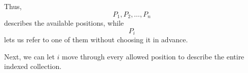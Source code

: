 	Thus,
	\[
	P_1,P_2,\ldots,P_n
	\]
	describes the available positions, while
	\[
	P_i
	\]
	lets us refer to one of them without choosing it in advance.
	
	Next, we can let $i$ move through every allowed position to describe the entire indexed collection.
	
	
	
